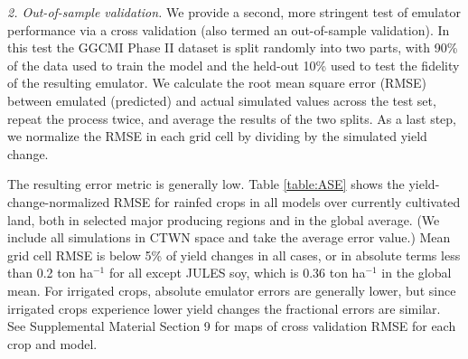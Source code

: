 \documentclass[gmdd]{copernicus} %
\begin{document}
\smallskip
\textit{2. Out-of-sample validation.} 
We provide a second, more stringent test of emulator performance via a cross validation (also termed an out-of-sample validation). 
In this test the GGCMI Phase II dataset is split randomly into two parts, with 90\% of the data used to train the model and the held-out 10\% used to test the fidelity of the resulting emulator.
We calculate the root mean square error (RMSE) between emulated (predicted) and actual simulated values across the test set, repeat the process twice, and average the results of the two splits. 
As a last step, we normalize the RMSE in each grid cell by dividing by the simulated yield change.

The resulting error metric is generally low.
Table \ref{table:ASE} shows the yield-change-normalized RMSE for rainfed crops in all models over currently cultivated land, both in selected major producing regions and in the global average. (We include all simulations in CTWN space and take the average error value.) 
Mean grid cell RMSE is below 5\% of yield changes in all cases, or in absolute terms 
less than 0.2 ton ha$^{-1}$ for all except JULES soy, which is 0.36 ton ha$^{-1}$ in the global mean.
For irrigated crops, absolute emulator errors are generally lower, but since irrigated crops experience lower yield changes the fractional errors are similar. 
See Supplemental Material Section 9 for maps of cross validation RMSE for each crop and model.
\end{document}
